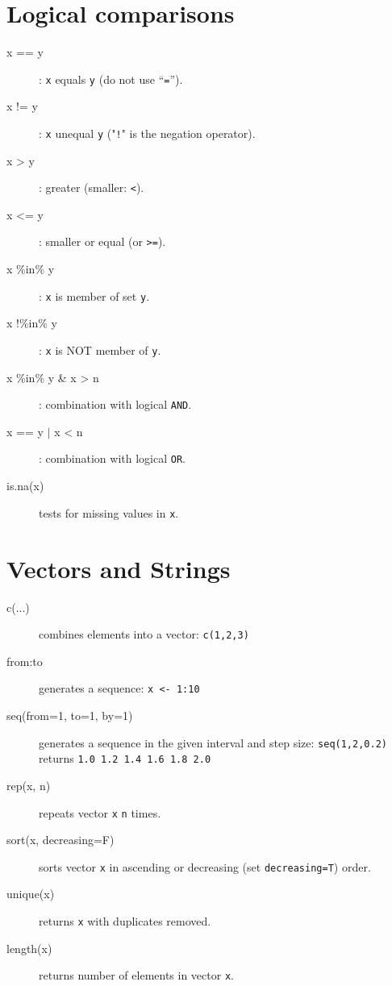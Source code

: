 \documentclass[a4paper,9pt]{extarticle}
\begin{document}
\begin{multicols}{3}
\section{Logical comparisons}
\begin{description}
\item[x == y]: \texttt{x} equals \texttt{y} (do not use ``\texttt{=}'').
\item[x != y]: \texttt{x} unequal \texttt{y} ("\texttt{!}" is the negation operator).
\item[x > y]: greater (smaller: \texttt{<}).
\item[x <= y]: smaller or equal (or \texttt{>=}).
\item[x \%in\% y]: \texttt{x} is member of set \texttt{y}.
\item[x !\%in\% y]: \texttt{x} is NOT member of \texttt{y}.
\item[x \%in\% y \& x > n]: combination with logical \texttt{AND}.
\item[x == y $\mid$ x < n]: combination with logical \texttt{OR}.
\item[is.na(x)] tests for missing values in \texttt{x}.
\end{description}


\section{Vectors and Strings}
\begin{description}
\item[c(...)] combines elements into a vector: \texttt{c(1,2,3)}
\item[from:to] generates a sequence: \texttt{x <- 1:10}
\item[seq(from=1, to=1, by=1)] generates a sequence in the given interval and step size: \texttt{seq(1,2,0.2)} returns \texttt{1.0 1.2 1.4 1.6 1.8 2.0}
\item[rep(x, n)] repeats vector \texttt{x} \texttt{n} times.
\item[sort(x, decreasing=F)] sorts vector \texttt{x} in ascending or decreasing (set \texttt{decreasing=T}) order.
\item[unique(x)] returns \texttt{x} with duplicates removed.
\item[length(x)] returns number of elements in vector \texttt{x}.


\end{description}
\end{multicols}
\end{document}
